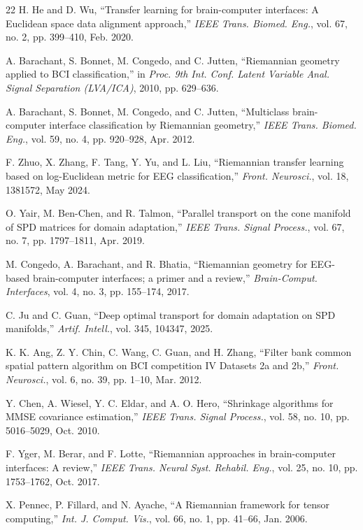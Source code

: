 \documentclass[journal,twoside,web]{ieeecolor2}
\begin{document}
\begin{thebibliography}{22}
H. He and D. Wu, ``Transfer learning for brain-computer interfaces:
A Euclidean space data alignment approach,'' \emph{IEEE Trans.
Biomed. Eng.}, vol. 67, no. 2, pp. 399--410, Feb. 2020.

A. Barachant, S. Bonnet, M. Congedo, and C. Jutten, ``Riemannian
geometry applied to BCI classification,'' in \emph{Proc. 9th Int.
Conf. Latent Variable Anal. Signal Separation (LVA/ICA)}, 2010,
pp. 629--636.

A. Barachant, S. Bonnet, M. Congedo, and C. Jutten, ``Multiclass
brain-computer interface classification by Riemannian geometry,''
\emph{IEEE Trans. Biomed. Eng.}, vol. 59, no. 4, pp. 920--928,
Apr. 2012.

F. Zhuo, X. Zhang, F. Tang, Y. Yu, and L. Liu, ``Riemannian
transfer learning based on log-Euclidean metric for EEG
classification,'' \emph{Front. Neurosci.}, vol. 18, 1381572,
May 2024.

O. Yair, M. Ben-Chen, and R. Talmon, ``Parallel transport on the
cone manifold of SPD matrices for domain adaptation,''
\emph{IEEE Trans. Signal Process.}, vol. 67, no. 7, pp. 1797--1811,
Apr. 2019.

M. Congedo, A. Barachant, and R. Bhatia, ``Riemannian geometry for
EEG-based brain-computer interfaces; a primer and a review,''
\emph{Brain-Comput. Interfaces}, vol. 4, no. 3, pp. 155--174,
2017.

C. Ju and C. Guan, ``Deep optimal transport for domain adaptation
on SPD manifolds,'' \emph{Artif. Intell.}, vol. 345, 104347, 2025.

K. K. Ang, Z. Y. Chin, C. Wang, C. Guan, and H. Zhang, ``Filter bank
common spatial pattern algorithm on BCI competition IV Datasets 2a
and 2b,'' \emph{Front. Neurosci.}, vol. 6, no. 39, pp. 1--10,
Mar. 2012.

Y. Chen, A. Wiesel, Y. C. Eldar, and A. O. Hero, ``Shrinkage
algorithms for MMSE covariance estimation,'' \emph{IEEE Trans.
Signal Process.}, vol. 58, no. 10, pp. 5016--5029, Oct. 2010.

F. Yger, M. Berar, and F. Lotte, ``Riemannian approaches in
brain-computer interfaces: A review,'' \emph{IEEE Trans. Neural
Syst. Rehabil. Eng.}, vol. 25, no. 10, pp. 1753--1762, Oct. 2017.

X. Pennec, P. Fillard, and N. Ayache, ``A Riemannian framework
for tensor computing,'' \emph{Int. J. Comput. Vis.}, vol. 66,
no. 1, pp. 41--66, Jan. 2006.


\end{thebibliography}
\end{document}
